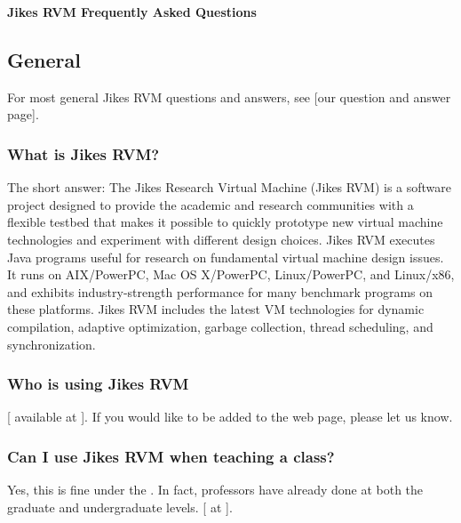 \begin{center}  
{\bf Jikes RVM Frequently Asked Questions}
\end{center}

\subsection{General}

For most general Jikes\TMweb{} RVM questions and answers, see
\xlink*{\texttt{\QandAURL}}[our question and answer page]{\QandAURL}.

\subsubsection{What is Jikes RVM?} 

The short answer:
The Jikes Research Virtual Machine (Jikes RVM) is a software project
designed to provide the academic and research communities with a
flexible testbed that makes it possible to quickly prototype new
virtual machine technologies and experiment with different design
choices.  Jikes RVM executes Java\TMweb{} programs useful for research on
fundamental virtual machine design issues.
It runs on AIX\TMweb{}/PowerPC\TMweb{}, Mac OS X/PowerPC,
Linux\Rweb{}/PowerPC, and Linux/x86, 
and exhibits industry-strength performance for many benchmark programs
on these platforms.  Jikes RVM includes the latest VM
technologies for dynamic compilation, adaptive optimization, garbage
collection, thread scheduling, and synchronization.

\subsubsection{Who is using Jikes RVM}

[ available at
{\tt \RVMUsersURL}]{\RVMUsersURL}.  If you would like to 
be added to the web page, please let us know.

\subsubsection{Can I use Jikes RVM when teaching a class?}

Yes, this is fine under the
.  In fact,  professors
have already done at both the graduate and undergraduate levels.
[ at {\tt \RVMTeachingResourcesURL}]{\RVMTeachingResourcesURL}.

